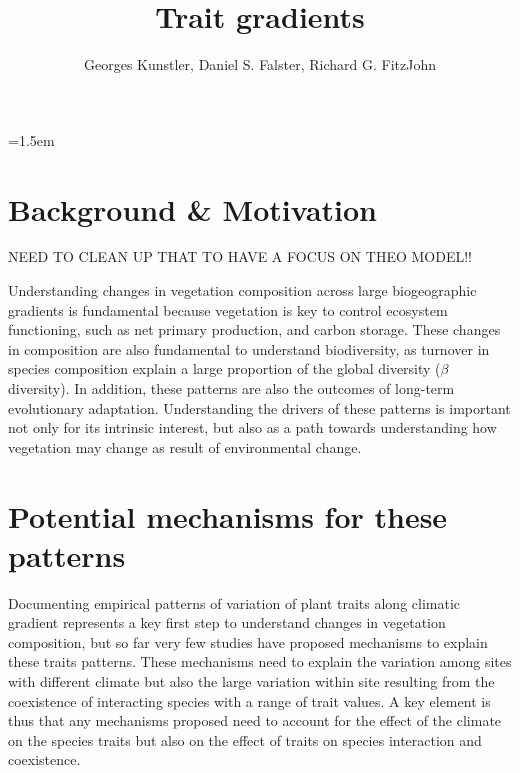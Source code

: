\documentclass[a4paper,11pt]{article}
\title{Trait gradients}
\author{ Georges Kunstler, Daniel S. Falster, Richard G. FitzJohn}
\date{}
\affiliation{Department of Biological Sciences, Macquarie University,
  Sydney, Australia}
\begin{document}
\mstitleshort
\parindent=1.5em
\addtolength{\parskip}{.3em}


\section{Background \& Motivation}


NEED TO CLEAN UP THAT TO HAVE A FOCUS ON THEO MODEL!!

Understanding changes in vegetation composition across large biogeographic gradients is fundamental because vegetation is key to control ecosystem functioning, such as net primary production, and carbon storage. These changes in composition are also fundamental to understand biodiversity, as turnover in species composition explain a large proportion of the global diversity ($\beta$ diversity). In addition, these patterns are also the outcomes of long-term evolutionary adaptation. Understanding the drivers of these patterns is important not only for its intrinsic interest, but also as a path towards understanding how vegetation may change as result of environmental change.


\clearpage

\section{Potential mechanisms for these patterns}

Documenting empirical patterns of variation of plant traits along climatic gradient represents a key first step to understand changes in vegetation composition, but so far very few studies have proposed mechanisms to explain these traits patterns. These mechanisms need to explain the variation among sites with different climate but also the large variation within site resulting from the coexistence of interacting species with a range of trait values. A key element is thus that any mechanisms proposed need to account for the effect of the climate on the species traits but also on the effect of traits on species interaction and coexistence.
\end{document}
